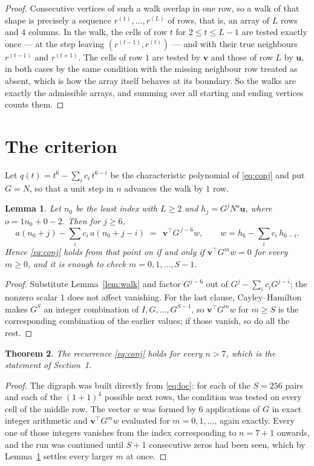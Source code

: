 \documentclass[11pt,a4paper]{article}
\theoremstyle{plain}
\newtheorem{theorem}{Theorem}
\newtheorem{lemma}[theorem]{Lemma}
\theoremstyle{definition}
\begin{document}
\begin{proof}
Consecutive vertices of such a walk overlap in one row, so a walk of that shape is
precisely a sequence $r^{(1)},\dots,r^{(L)}$ of rows, that is, an array of $L$ rows
and $4$ columns. In the walk, the cells of row $t$ for $2\le t\le L-1$ are tested
exactly once --- at the step leaving $(r^{(t-1)},r^{(t)})$ --- and with their true
neighbours $r^{(t-1)}$ and $r^{(t+1)}$. The cells of row $1$ are tested by
$\mathbf{v}$ and those of row $L$ by $\mathbf{u}$, in both cases by the same condition
with the missing neighbour row treated as absent, which is how the array itself behaves at
its boundary. So the walks are exactly the admissible arrays, and summing over all starting
and ending vertices counts them.
\end{proof}

\section{The criterion}

Let $q(t)=t^{6}-\sum_i c_i\,t^{6-i}$ be the characteristic polynomial of
\eqref{eq:conj} and put $G=N$, so that a unit step in $n$ advances the walk by
$1$ row.

\begin{lemma}\label{lem:crit}
Let $n_0$ be the least index with $L\ge2$ and $h_j=G^{j}N^{o}\mathbf{u}$, where
$o=1n_0+0-2$. Then for $j\ge6$,
\[
a(n_0+j)-\sum_i c_i\,a(n_0+j-i)\;=\;\,\mathbf{v}^{\!\top}G^{\,j-6}w,
\qquad w=h_{6}-\sum_i c_i\,h_{6-i} .
\]
Hence \eqref{eq:conj} holds from that point on if and only if
$\mathbf{v}^{\!\top}G^{m}w=0$ for every $m\ge0$, and it is enough to check
$m=0,1,\dots,S-1$.
\end{lemma}

\begin{proof}
Substitute Lemma~\ref{lem:walk} and factor $G^{j-6}$ out of
$G^{j}-\sum_ic_iG^{j-i}$; the nonzero scalar $1$ does not affect
vanishing. For the last clause, Cayley--Hamilton makes $G^{S}$ an integer combination of
$I,G,\dots,G^{S-1}$, so $\mathbf{v}^{\!\top}G^{m}w$ for $m\ge S$ is the corresponding
combination of the earlier values; if those vanish, so do all the rest.
\end{proof}

\begin{theorem}
The recurrence \eqref{eq:conj} holds for every $n>7$, which is the statement of
Section~1.
\end{theorem}

\begin{proof}
The digraph was built directly from \eqref{eq:loc}: for each of the $S=256$ pairs and each
of the $(1+1)^{4}$ possible next rows, the condition was tested on every cell of
the middle row. The vector $w$ was formed by $6$ applications of $G$ in exact integer
arithmetic and $\mathbf{v}^{\!\top}G^{m}w$ evaluated for $m=0,1,\dots$, again exactly.
Every one of those integers vanishes from the index corresponding to $n=7+1$ onwards,
and the run was continued until $S+1$ consecutive zeros had been seen, which by
Lemma~\ref{lem:crit} settles every larger $m$ at once.
\end{proof}
\end{document}
